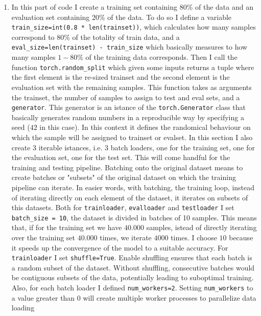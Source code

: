 \documentclass[a4paper]{article}
\begin{document}
\begin{enumerate}
	\item In this part of code I create a training set containing 80\% of the data and an evaluation set containing 20\% of the data. To do so I define a variable \texttt{train\_size=int(0.8 * len(trainset))}, which calculates how many samples correspond to 80\% of the totality of train data, and a \texttt{eval\_size=len(trainset) - train\_size} which basically measures to how many samples $1-80\%$ of the training data corresponds. Then I call the function \texttt{torch.random\_split} which given some inputs returns a tuple where the first element is the re-sized trainset and the second element is the evaluation set with the remaining samples. This function takes as arguments the trainset, the number of samples to assign to test and eval sets, and a \texttt{generator}. This generator is an istance of the \texttt{torch.Generator} class that basically generates random numbers in a reproducible way by specifying a seed ($42$ in this case). In this context it defines the randomical behaviour on which the sample will be assigned to trainset or evalset. In this section I also create 3 iterable istances, i.e. 3 batch loaders, one for the training set, one for the evaluation set, one for the test set. This will come handful for the training and testing pipeline. Batching onto the original dataset means to create batches or "subsets" of the original dataset on which the training pipeline can iterate. In easier words, with batching, the training loop, instead of iterating directly on each element of the dataset, it iterates on subsets of this datasets. Both for \texttt{trainloader}, \texttt{evalloader} and \texttt{testloader}  I set \texttt{batch\_size = 10}, the dataset is divided in batches of 10 samples. This means that, if for the training set we have $40.000$ samples, istead of directly iterating over the training set $40.000$ times, we iterate $4000$ times. I choose $10$ because it speeds up the convergence of the model to a suitable accuracy. For \texttt{trainloader} I set \texttt{shuffle=True}. Enable shuffling ensures that each batch is a random subset of the dataset. Without shuffling, consecutive batches would be contiguous subsets of the data, potentially leading to suboptimal training. Also, for each batch loader I defined \texttt{num\_workers=2}. Setting \texttt{num\_workers} to a value greater than 0 will create multiple worker processes to parallelize data loading
	
\end{enumerate}
\end{document}
